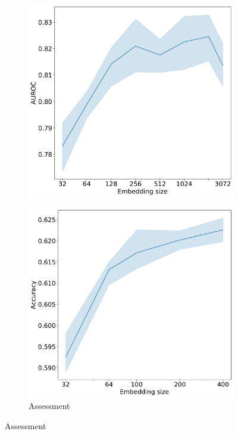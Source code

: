 \documentclass[sigconf, anonymous]{acmart}
\begin{document}
\begin{figure}
\begin{subfigure}{0.25\linewidth}
    \includegraphics[width=\linewidth]{figures/hidden_size_rosbank.pdf}
  \end{subfigure}%
  \begin{subfigure}{0.25\linewidth}
    \caption{Assessment}
    \includegraphics[width=\linewidth]{figures/hidden_size_bowl2019.pdf}
  \end{subfigure}%

\end{figure}
\end{document}
